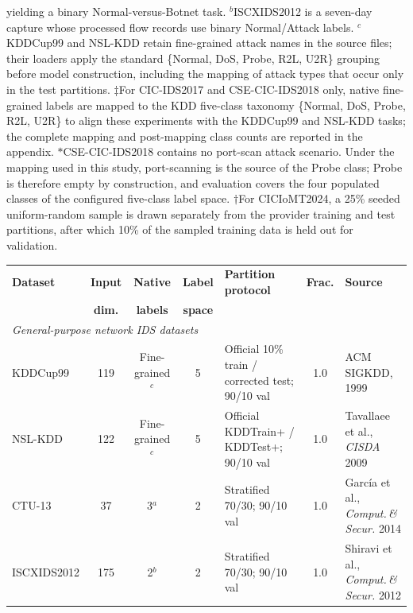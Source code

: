\begin{table}[!ht]
{yielding a binary Normal-versus-Botnet task.
$^{b}$ISCXIDS2012 is a seven-day capture whose processed flow records use
binary Normal/Attack labels.
$^{c}$KDDCup99 and NSL-KDD retain fine-grained attack names in the source
files; their loaders apply the standard \{Normal, DoS, Probe, R2L, U2R\}
grouping before model construction, including the mapping of attack types
that occur only in the test partitions.
$\ddagger$For CIC-IDS2017 and CSE-CIC-IDS2018 only, native fine-grained
labels are mapped to the KDD five-class taxonomy \{Normal, DoS, Probe, R2L,
U2R\} to align these experiments with the KDDCup99 and NSL-KDD tasks; the
complete mapping and post-mapping class counts are reported in the appendix.
$*$CSE-CIC-IDS2018 contains no port-scan attack scenario. Under the mapping
used in this study, port-scanning is the source of the Probe class; Probe is
therefore empty by construction, and evaluation covers the four populated
classes of the configured five-class label space.
$\dagger$For CICIoMT2024, a 25\% seeded uniform-random sample is drawn
separately from the provider training and test partitions, after which 10\%
of the sampled training data is held out for validation.}
\label{tab:datasets_overview}
{\footnotesize
\begin{tabular}{l c c c l c l}
\toprule
\textbf{Dataset} & \textbf{Input} & \textbf{Native} & \textbf{Label} &
\textbf{Partition protocol} & \textbf{Frac.} & \textbf{Source} \\
& \textbf{dim.} & \textbf{labels} & \textbf{space} & & & \\
\midrule
\multicolumn{7}{l}{\textit{General-purpose network IDS datasets}} \\
\midrule

KDDCup99
& 119 & Fine-grained$^{c}$ & 5
& Official 10\% train / corrected test; 90/10 val
& 1.0
& ACM SIGKDD, 1999 \cite{kddcup1999} \\

NSL-KDD
& 122 & Fine-grained$^{c}$ & 5
& Official KDDTrain+ / KDDTest+; 90/10 val
& 1.0
& Tavallaee et al., \textit{CISDA} 2009 \cite{tavallaee2009detailed} \\

CTU-13
& 37 & 3$^{a}$ & 2
& Stratified 70/30; 90/10 val
& 1.0
& Garc\'ia et al., \textit{Comput.\,\&\,Secur.} 2014 \cite{garcia2014empirical} \\

ISCXIDS2012
& 175 & 2$^{b}$ & 2
& Stratified 70/30; 90/10 val
& 1.0
& Shiravi et al., \textit{Comput.\,\&\,Secur.} 2012 \cite{shiravi2012toward} \\


\end{tabular}}
\end{table}
